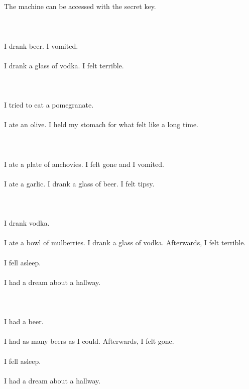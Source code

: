 \documentclass{article}
\begin{document}
    \section{}
    The machine can be accessed with the secret key.\\\\ 
    \newpage
    
    \section{}
    I drank beer. I vomited.\\\\I drank a glass of vodka. I felt terrible.\\\\ 
    \newpage
    
    \section{}
    I tried to eat a pomegranate.\\\\I ate an olive. I held my stomach for what felt like a long time.\\\\ 
    \newpage
    
    \section{}
    I ate a plate of anchovies. I felt gone and I vomited.\\\\I ate a garlic. I drank a glass of beer. I felt tipsy.\\\\ 
    \newpage
    
    \section{}
    I drank vodka.\\\\I ate a bowl of mulberries. I drank a glass of vodka. Afterwards, I felt terrible.\\\\I fell asleep.\\\\I had a dream about a hallway.\\\\ 
    \newpage
    
    \section{}
    I had a beer.\\\\I had as many beers as I could. Afterwards, I felt gone.\\\\I fell asleep.\\\\I had a dream about a hallway.\\\\ 
    \newpage
    
\end{document}

